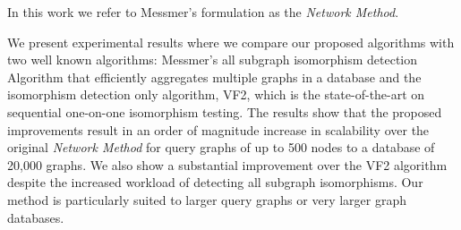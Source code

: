 In this work we refer to Messmer's formulation as the \textit{Network Method}.


We present experimental results where we compare our proposed algorithms with two well known algorithms: Messmer's\cite{messmer_bunke2000} all subgraph isomorphism 
detection Algorithm that efficiently aggregates multiple graphs in a database and the isomorphism detection only algorithm, VF2\cite{cordella2001_vf2}, which is the 
state-of-the-art on sequential one-on-one isomorphism testing. The results show that the proposed improvements result in an order of magnitude increase in scalability 
over the original \textit{Network Method}  for query graphs of up to 500 nodes to a database of 20,000 graphs. We also show a substantial improvement over the VF2 
algorithm despite the increased workload of detecting all subgraph isomorphisms. Our method is particularly suited to larger query graphs or very larger graph 
databases.
